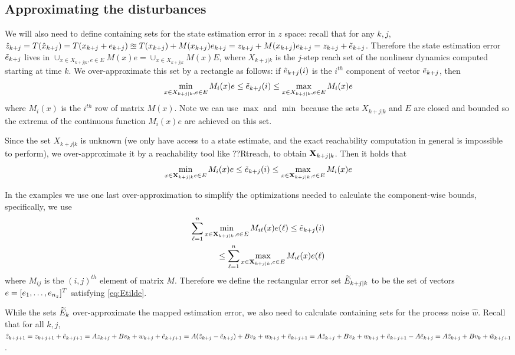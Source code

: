 \subsection{Approximating the  disturbances}
\label{sec:approx dist}
We will also need to define containing sets for the state estimation error in $z$ space:
recall that for any $k,j$, 
$\hat{z}_{k+j} = T(\hat{x}_{k+j}) = T(x_{k+j} + e_{k+j}) \approxeq T(x_{k+j}) + M(x_{k+j})e_{k+j} = z_{k+j} + M(x_{k+j})e_{k+j} = z_{k+j} + \tilde{e}_{{k+j}}$.
Therefore the state estimation error $\tilde{e}_{k+j}$ lives in 
$\cup_{x\in X_{k+j|k}, e \in E}M(x)e = \cup_{x \in X_{k+j|k}}M(x)E$, 
where $X_{k+j|k}$ is the $j$-step reach set of the nonlinear dynamics computed starting at time $k$.
%
We over-approximate this set by a rectangle as follows: 
if $\tilde{e}_{k+j}(i)$ is the $i^{th}$ component of vector $\tilde{e}_{k+j}$, then 
\[\min_{x \in X_{k+j|k}, e \in E}M_i(x)e \leq \tilde{e}_{k+j}(i) \leq \max_{x \in X_{k+j|k}, e \in E} M_i(x)e\]
where $M_i(x)$ is the $i^{th}$ row of matrix $M(x)$.
Note we can use $\max$ and $\min$ because the sets $X_{k+j|k}$ and $E$ are closed and bounded so the extrema of the continuous function $M_i(x)e$ are achieved on this set.

Since the set $X_{k+j|k}$ is unknown (we only have access to a state estimate, and the exact reachability computation in general is impossible to perform), we over-approximate it by a reachability tool like ??Rtreach, to obtain $\mathbf{X}_{k+j|k}$.
Then it holds that 
\[\min_{x \in \mathbf{X}_{k+j|k} e \in E}M_i(x)e \leq \tilde{e}_{k+j}(i) \leq \max_{x \in \mathbf{X}_{k+j|k}, e \in E} M_i(x)e\]

In the examples we use one last over-approximation to simplify the optimizations needed to calculate the component-wise bounds, specifically, we use 
\begin{eqnarray}
\label{eq:Etilde}
\sum_{\ell=1}^{n} \min_{x \in \mathbf{X}_{k+j|k}, e \in E} M_{i\ell}(x)e(\ell)  \leq \tilde{e}_{k+j}(i) 
\nonumber 
\\
\leq \sum_{\ell=1}^{n} \max_{x \in \mathbf{X}_{k+j|k}, e \in E} M_{i\ell}(x)e(\ell)
\end{eqnarray}
where $M_{ij}$ is the $(i,j)^{th}$ element of matrix $M$.
Therefore we define the rectangular error set $\widetilde{E}_{k+j|k}$ to be the set of vectors $e = [e_1,\ldots, e_{n_z}]^T$ satisfying \eqref{eq:Etilde}.

While the sets $\widetilde{E}_{k}$ over-approximate the mapped estimation error, we also need to calculate containing sets for the process noise $\hat{w}$.
Recall that for all $k,j$, 
$\hat{z}_{k+j+1} = z_{k+j+1} + \tilde{e}_{k+j+1} = Az_{k+j}+Bv_k+w_{k+j} + \tilde{e}_{k+j+1} =  A(\hat{z}_{k+j} - \tilde{e}_{k+j}) + Bv_k + w_{k+j} + \tilde{e}_{k+j+1} = A\hat{z}_{k+j} + Bv_k + w_{k+j} + \tilde{e}_{k+j+1} - A \tilde{e}_{k+j} = A\hat{z}_{k+j} + Bv_k + \hat{w}_{k+j+1}$.

